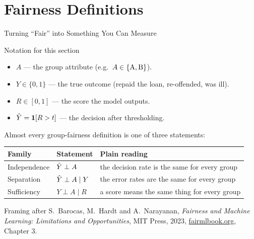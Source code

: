 \section{Fairness Definitions}

\begin{frame}{Turning ``Fair'' into Something You Can Measure}

    \begin{block}{Notation for this section}
        \begin{itemize}
            \item $A$ --- the group attribute (e.g.\ $A \in \{\text{A}, \text{B}\}$).
            \item $Y \in \{0,1\}$ --- the true outcome (repaid the loan, re-offended, was ill).
            \item $R \in [0,1]$ --- the score the model outputs.
            \item $\hat{Y} = \mathbf{1}[R > t]$ --- the decision after thresholding.
        \end{itemize}
    \end{block}

    \vspace{0.8em}

    Almost every group-fairness definition is one of three statements:

    \vspace{0.4em}
    \centering
    \small
    \begin{tabular}{lll}
        \toprule
        \textbf{Family} & \textbf{Statement} & \textbf{Plain reading} \\
        \midrule
        Independence & $\hat{Y} \perp A$ & the decision rate is the same for every group \\
        Separation   & $\hat{Y} \perp A \mid Y$ & the error rates are the same for every group \\
        Sufficiency  & $Y \perp A \mid R$ & a score means the same thing for every group \\
        \bottomrule
    \end{tabular}

    \vspace{1em}
    \raggedright
    {\scriptsize Framing after S.~Barocas, M.~Hardt and A.~Narayanan, \emph{Fairness and Machine
    Learning: Limitations and Opportunities}, MIT Press, 2023,
    \href{https://fairmlbook.org/}{fairmlbook.org}, Chapter 3.}
\end{frame}
